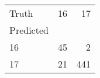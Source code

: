 \begin{tabular}{lrr}
\toprule
Truth & 16 & 17 \\
Predicted &  &  \\
\midrule
16 & 45 & 2 \\
17 & 21 & 441 \\
\bottomrule
\end{tabular}
